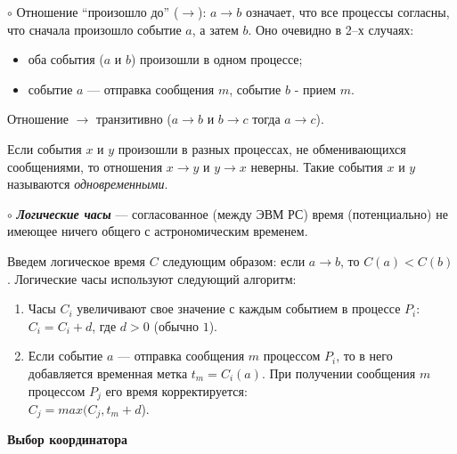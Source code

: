 $\circ$
Отношение ``произошло до'' ($\rightarrow$): $a \rightarrow b$ означает, что все процессы согласны, что сначала произошло событие $a$, а затем $b$. 
Оно очевидно в 2--х случаях:
\vspace{-0.7em}
\begin{itemize}
    \setlength\itemsep{-0.4em}
    \item {}оба события ($a$ и $b$) произошли в одном процессе;
    \item событие $a$ --- отправка сообщения $m$, событие $b$ - прием $m$.
\end{itemize}

Отношение $\rightarrow$ транзитивно ($a \rightarrow b$ и $b \rightarrow c$ тогда $a \rightarrow c$).

Если события $x$ и $y$ произошли в разных процессах, не обменивающихся сообщениями, то отношения $x \rightarrow y$ и $y \rightarrow x$ неверны. 
Такие события $x$ и $y$ называются \textit{одновременными}.

$\circ$
\textbf{\textit{Логические часы}} --- согласованное (между ЭВМ РС) время (потенциально) не имеющее ничего общего с астрономическим временем.

Введем логическое время $C$ следующим образом: если $a \rightarrow b$, то $C(a) < C(b)$.
Логические часы используют следующий алгоритм:
\begin{enumerate}
\item 
Часы $C_i$ увеличивают свое значение с каждым событием в процессе $P_i$:
$C_i = C_i + d$, где $d > 0$ (обычно $1$).

\item 
Если событие $a$ --- отправка сообщения $m$ процессом $P_i$, то в него добавляется временная метка $t_m=C_i(a)$.
При получении сообщения $m$ процессом $P_j$ его время корректируется: \\ $C_j = max(C_j,t_m + d$).
\end{enumerate}

\centerline{\textbf{Выбор координатора}}

